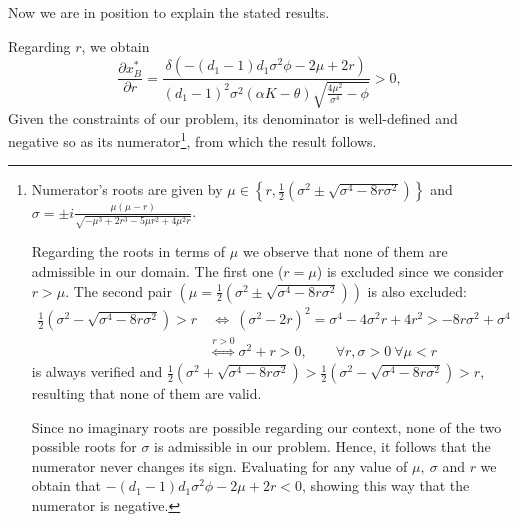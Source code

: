 Now we are in position to explain the stated results.

Regarding $r$, we obtain
$$\frac{\partial x^*_B}{\partial r}=\frac{\delta  \left(-(d_1-1) d_1 \sigma ^2 \phi-2 \mu +2 r \right)}{(d_1-1)^2 \sigma ^2 (\alpha  K-\theta ) \sqrt{\frac{4 \mu ^2}{\sigma ^4}-\phi}}>0,$$
Given the constraints of our problem, its denominator is well-defined and negative so as its numerator\footnote{Numerator's roots are given by $\mu \in \left\{r, \frac{1}{2}\left(\sigma ^2\pm\sqrt{\sigma ^4-8 r \sigma ^2}\right) \right\}$ and $\sigma = \pm i \frac{ \mu  (\mu -r)}{\sqrt{-\mu ^3+2 r^3-5 \mu  r^2+4 \mu ^2 r}}$.


Regarding the roots in terms of $\mu$ we observe that none of them are admissible in our domain. The first one ($r=\mu$) is excluded since we consider $r>\mu$. The second pair $\left(\mu=\frac{1}{2}\left(\sigma ^2\pm\sqrt{\sigma ^4-8 r \sigma ^2}\right) \right)$ is also excluded: 
\begin{align*}
\frac{1}{2}\left(\sigma ^2-\sqrt{\sigma ^4-8 r \sigma ^2}\right)>r & \ \Leftrightarrow \  (\sigma ^2-2r)^2= \sigma^4-4\sigma^2 r +4 r^2 > -8 r \sigma^2+\sigma^4\\
&\overset{r>0}{\Leftrightarrow} \sigma^2+r>0, \qquad \forall r, \sigma>0 \ \forall \mu<r
\end{align*}
is always verified and $\frac{1}{2}\left(\sigma ^2+\sqrt{\sigma ^4-8 r \sigma ^2}\right)>\frac{1}{2}\left(\sigma ^2-\sqrt{\sigma ^4-8 r \sigma ^2}\right)>r$, resulting that none of them are valid.

Since no imaginary roots are possible regarding our context, none of the two possible roots for $\sigma$ is admissible in our problem. Hence, it follows that the numerator never changes its sign. Evaluating for any value of $\mu, \ \sigma$ and $r$ we obtain that $-(d_1-1) d_1 \sigma ^2 \phi-2 \mu +2 r <0$, showing this way that the numerator is negative. },
from which the result follows.

